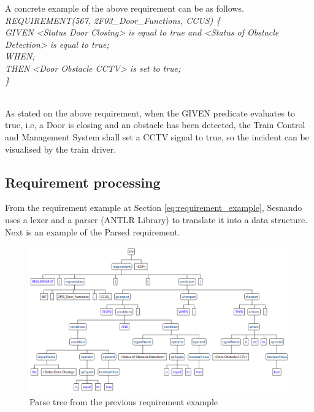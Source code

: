 A concrete example of the above requirement can be as follows.\\


\textit{
REQUIREMENT(567, 2F03\_Door\_Functions, CCUS) 
\{\\
	GIVEN <Status Door Closing> is equal to true and <Status of Obstacle Detection> is equal to true;\\
	WHEN;\\
	THEN <Door Obstacle CCTV> is set to true;\\
\}\\
}\\
\label{eq:requirement_example2}

As stated on the above requirement, when the GIVEN predicate evaluates to true, i.e, a Door is closing and an obstacle has been detected, the Train Control and Management System shall set a CCTV signal to true, so the incident can be visualised by the train driver.

\newpage

\subsection{Requirement processing}
\label{subsec:requirement_processing}

From the requirement example at Section \ref{eq:requirement_example}, Sesnando uses a lexer and a parser (ANTLR Library) to translate it into a data structure. Next is an example of the Parsed requirement.

\begin{figure}[H]
    \centering
    \includegraphics[scale=0.625]{images/parse_tree_req_example.PNG}
    \caption{Parse tree from the previous requirement example}
    \label{fig:req_parse_tree}
\end{figure}

